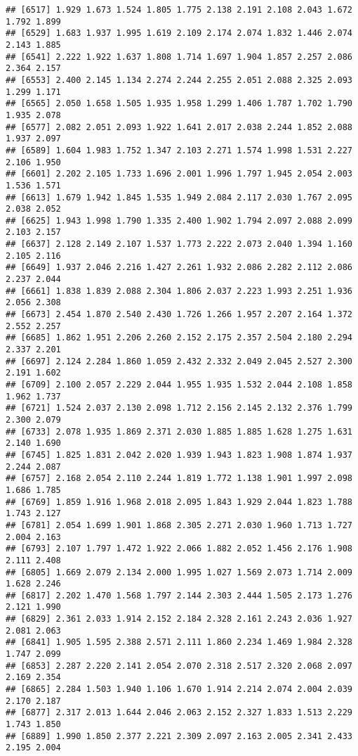 \documentclass[
]{article}
\begin{document}
\begin{verbatim}
## [6517] 1.929 1.673 1.524 1.805 1.775 2.138 2.191 2.108 2.043 1.672 1.792 1.899
## [6529] 1.683 1.937 1.995 1.619 2.109 2.174 2.074 1.832 1.446 2.074 2.143 1.885
## [6541] 2.222 1.922 1.637 1.808 1.714 1.697 1.904 1.857 2.257 2.086 2.364 2.157
## [6553] 2.400 2.145 1.134 2.274 2.244 2.255 2.051 2.088 2.325 2.093 1.299 1.171
## [6565] 2.050 1.658 1.505 1.935 1.958 1.299 1.406 1.787 1.702 1.790 1.935 2.078
## [6577] 2.082 2.051 2.093 1.922 1.641 2.017 2.038 2.244 1.852 2.088 1.937 2.097
## [6589] 1.604 1.983 1.752 1.347 2.103 2.271 1.574 1.998 1.531 2.227 2.106 1.950
## [6601] 2.202 2.105 1.733 1.696 2.001 1.996 1.797 1.945 2.054 2.003 1.536 1.571
## [6613] 1.679 1.942 1.845 1.535 1.949 2.084 2.117 2.030 1.767 2.095 2.038 2.052
## [6625] 1.943 1.998 1.790 1.335 2.400 1.902 1.794 2.097 2.088 2.099 2.103 2.157
## [6637] 2.128 2.149 2.107 1.537 1.773 2.222 2.073 2.040 1.394 1.160 2.105 2.116
## [6649] 1.937 2.046 2.216 1.427 2.261 1.932 2.086 2.282 2.112 2.086 2.237 2.044
## [6661] 1.838 1.839 2.088 2.304 1.806 2.037 2.223 1.993 2.251 1.936 2.056 2.308
## [6673] 2.454 1.870 2.540 2.430 1.726 1.266 1.957 2.207 2.164 1.372 2.552 2.257
## [6685] 1.862 1.951 2.206 2.260 2.152 2.175 2.357 2.504 2.180 2.294 2.337 2.201
## [6697] 2.124 2.284 1.860 1.059 2.432 2.332 2.049 2.045 2.527 2.300 2.191 1.602
## [6709] 2.100 2.057 2.229 2.044 1.955 1.935 1.532 2.044 2.108 1.858 1.962 1.737
## [6721] 1.524 2.037 2.130 2.098 1.712 2.156 2.145 2.132 2.376 1.799 2.300 2.079
## [6733] 2.078 1.935 1.869 2.371 2.030 1.885 1.885 1.628 1.275 1.631 2.140 1.690
## [6745] 1.825 1.831 2.042 2.020 1.939 1.943 1.823 1.908 1.874 1.937 2.244 2.087
## [6757] 2.168 2.054 2.110 2.244 1.819 1.772 1.138 1.901 1.997 2.098 1.686 1.785
## [6769] 1.859 1.916 1.968 2.018 2.095 1.843 1.929 2.044 1.823 1.788 1.743 2.127
## [6781] 2.054 1.699 1.901 1.868 2.305 2.271 2.030 1.960 1.713 1.727 2.004 2.163
## [6793] 2.107 1.797 1.472 1.922 2.066 1.882 2.052 1.456 2.176 1.908 2.111 2.408
## [6805] 1.669 2.079 2.134 2.000 1.995 1.027 1.569 2.073 1.714 2.009 1.628 2.246
## [6817] 2.202 1.470 1.568 1.797 2.144 2.303 2.444 1.505 2.173 1.276 2.121 1.990
## [6829] 2.361 2.033 1.914 2.152 2.184 2.328 2.161 2.243 2.036 1.927 2.081 2.063
## [6841] 1.905 1.595 2.388 2.571 2.111 1.860 2.234 1.469 1.984 2.328 1.747 2.099
## [6853] 2.287 2.220 2.141 2.054 2.070 2.318 2.517 2.320 2.068 2.097 2.169 2.354
## [6865] 2.284 1.503 1.940 1.106 1.670 1.914 2.214 2.074 2.004 2.039 2.170 2.187
## [6877] 2.317 2.013 1.644 2.046 2.063 2.152 2.327 1.833 1.513 2.229 1.743 1.850
## [6889] 1.990 1.850 2.377 2.221 2.309 2.097 2.163 2.005 2.341 2.433 2.195 2.004

\end{verbatim}
\end{document}
